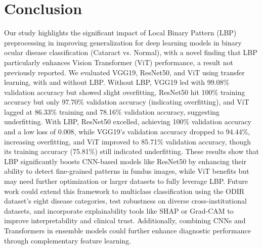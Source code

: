 \documentclass{ijclclp}
\begin{document}
\section{Conclusion}\label{sec:con}
\begin{flushleft}
\justifying
Our study highlights the significant impact of Local Binary Pattern (LBP) preprocessing in improving generalization for deep learning models in binary ocular disease classification (Cataract vs. Normal), with a novel finding that LBP particularly enhances Vision Transformer (ViT) performance, a result not previously reported. We evaluated VGG19, ResNet50, and ViT using transfer learning, with and without LBP. Without LBP, VGG19 led with 99.08\% validation accuracy but showed slight overfitting, ResNet50 hit 100\% training accuracy but only 97.70\% validation accuracy (indicating overfitting), and ViT lagged at 86.33\% training and 78.16\% validation accuracy, suggesting underfitting. With LBP, ResNet50 excelled, achieving 100\% validation accuracy and a low loss of 0.008, while VGG19’s validation accuracy dropped to 94.44\%, increasing overfitting, and ViT improved to 85.71\% validation accuracy, though its training accuracy (75.81\%) still indicated underfitting. These results show that LBP significantly boosts CNN-based models like ResNet50 by enhancing their ability to detect fine-grained patterns in fundus images, while ViT benefits but may need further optimization or larger datasets to fully leverage LBP. Future work could extend this framework to multiclass classification using the ODIR dataset’s eight disease categories, test robustness on diverse cross-institutional datasets, and incorporate explainability tools like SHAP or Grad-CAM to improve interpretability and clinical trust. Additionally, combining CNNs and Transformers in ensemble models could further enhance diagnostic performance through complementary feature learning.
\end{flushleft}

\begin{table}[H]
\centering
\caption{Summary of Model Performance and Observations Before and After LBP}
\label{tab:conclusion_summary}
\end{table}
\end{document}
